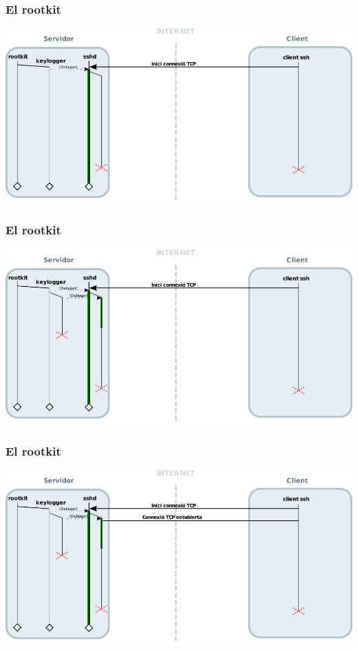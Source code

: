 \documentclass{beamer}
\begin{document}
\begin{frame}
	\frametitle{El rootkit}
	\includegraphics[scale=0.65,keepaspectratio]{sshd_keylogger_4.pdf}
\end{frame}

\begin{frame}
	\frametitle{El rootkit}
	\includegraphics[scale=0.65,keepaspectratio]{sshd_keylogger_5.pdf}
\end{frame}

\begin{frame}
	\frametitle{El rootkit}
	\includegraphics[scale=0.65,keepaspectratio]{sshd_keylogger_6.pdf}
\end{frame}
\end{document}
